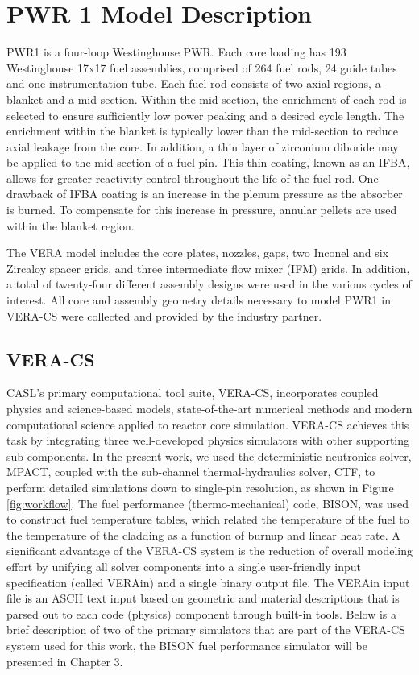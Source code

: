 \documentclass[edeposit,fullpage,11pt]{uiucthesis2009}
\begin{document}
\section{PWR 1 Model Description}
PWR1 is a four-loop Westinghouse PWR.
Each core loading has 193 Westinghouse 17x17 fuel assemblies, comprised of 264 fuel rods, 24 guide tubes and one instrumentation tube. 
Each fuel rod consists of two axial regions, a blanket and a mid-section. 
Within the mid-section, the enrichment of each rod is selected to ensure sufficiently low power peaking and a desired cycle length. 
The enrichment within the blanket is typically lower than the mid-section to reduce axial leakage from the core. 
In addition, a thin layer of zirconium diboride may be applied to the mid-section of a fuel pin. 
This thin coating, known as an \gls{IFBA}, allows for greater reactivity control throughout the life of the fuel rod. 
One drawback of IFBA coating is an increase in the plenum pressure as the absorber is burned. 
To compensate for this increase in pressure, annular pellets are used within the blanket region. 

The VERA model includes the core plates, nozzles, gaps, two Inconel and six Zircaloy spacer grids, and three intermediate flow mixer (IFM) grids. 
In addition, a total of twenty-four different assembly designs were used in the various cycles of interest. 
All core and assembly geometry details necessary to model PWR1 in VERA-CS were collected and provided by the industry partner.


\subsection{VERA-CS}
\gls{CASL}'s primary computational tool suite, VERA-CS, incorporates coupled physics and science-based models, state-of-the-art numerical methods and modern computational science applied to reactor core simulation. 
VERA-CS achieves this task by integrating three well-developed physics simulators with other supporting sub-components. 
In the present work, we used the deterministic neutronics solver, MPACT, coupled with the sub-channel thermal-hydraulics solver, CTF, to perform detailed simulations down to single-pin resolution, as shown in Figure \ref{fig:workflow}.
The fuel performance (thermo-mechanical) code, BISON, was used to construct fuel temperature tables, which related the temperature of the fuel to the temperature of the cladding as a function of burnup and linear heat rate.  
A significant advantage of the VERA-CS system is the reduction of overall modeling effort by unifying all solver components into a single user-friendly input specification (called VERAin) and a single binary output file.
The VERAin input file is an ASCII text input based on geometric and material descriptions that is parsed out to each code (physics) component through built-in tools. 
Below is a brief description of two of the primary simulators that are part of the VERA-CS system used for this work, the BISON fuel performance simulator will be presented in Chapter 3.
\end{document}
